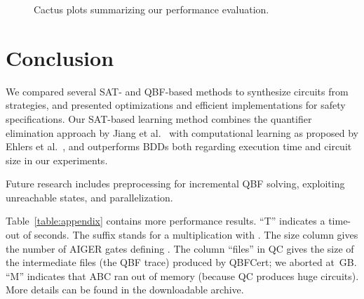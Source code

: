 \documentclass[conference]{IEEEtran}
\newcommand{\qbfcert}{\textsf{QBFCert}\xspace}
\newcommand{\Abc}{\textsf{ABC}\xspace}
\newcommand{\aiger}{\textsf{AIGER}\xspace}
\begin{document}
\begin{figure}[htb]
\centering
   \caption{Cactus plots summarizing our performance evaluation.}
  \label{fig:cactus}
\end{figure}

\section{Conclusion} \label{sec:concl}

We compared several SAT- and QBF-based methods to synthesize circuits from 
strategies, and presented optimizations and efficient implementations for safety 
specifications.  Our SAT-based learning method combines the quantifier 
elimination approach by Jiang et al.~\cite{JiangLH09} with computational 
learning as proposed by Ehlers et al.~\cite{EhlersKH12}, and outperforms BDDs 
both regarding execution time and circuit size in our experiments.

Future research includes preprocessing for incremental QBF solving, exploiting 
unreachable states, and parallelization.




\begin{table*}
\appendix
Table~\ref{table:appendix} contains more performance results.
``T'' indicates a time-out of  seconds. The suffix  stands for
a multiplication with .  The size column  gives the number of
\aiger gates defining .  The column ``files'' in \textsf{QC} gives the
size of the intermediate files (the QBF trace) produced by \qbfcert;  we
aborted at \,GB. ``M'' indicates that \Abc ran out of
memory (because \textsf{QC} produces huge circuits).  More details can be
found in the downloadable archive.
\end{table*}
\end{document}
